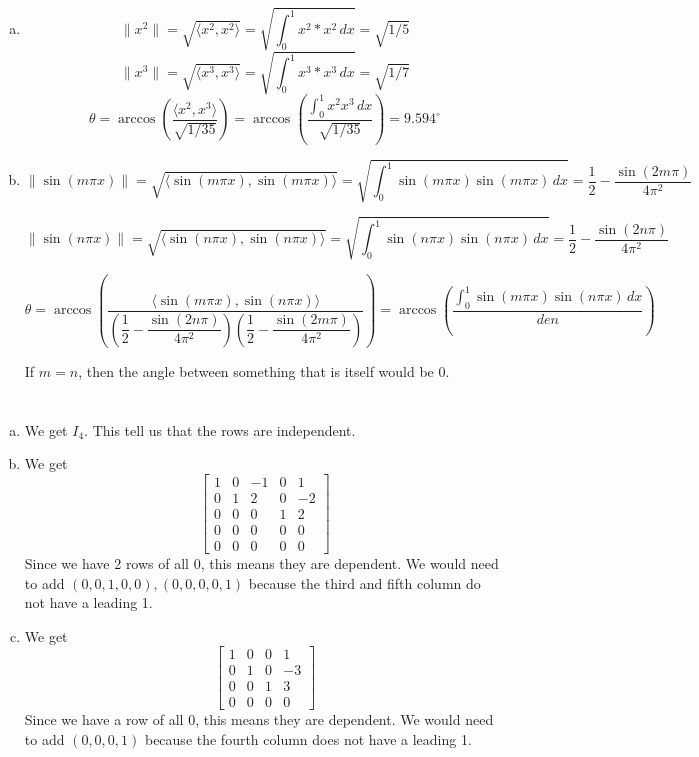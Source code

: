 \documentclass[12pt]{article}
\begin{document}
\section{}
\begin{enumerate}[(a)]
	\item \[ \|x^2\| = \sqrt{\langle x^2, x^2 \rangle} = \sqrt{\int_{0}^{1} x^2 * x^2 \,dx} = \sqrt{1/5}\]
	\[ \|x^3\| = \sqrt{\langle x^3, x^3 \rangle} = \sqrt{\int_{0}^{1} x^3 * x^3 \,dx} = \sqrt{1/7}\]
	\[\theta = \arccos\left(\dfrac{\langle x^2, x^3 \rangle}{\sqrt{1/35}}\right) = \arccos\left(\dfrac{\int_{0}^{1} x^2 x^3 \,dx}{\sqrt{1/35}}\right) = 9.594^{\circ}\]
	
	\item \[ \|\sin(m\pi x)\| = \sqrt{\langle \sin(m\pi x), \sin(m\pi x) \rangle} = \sqrt{\int_{0}^{1} \sin(m\pi x)\sin(m\pi x)\, dx} = \dfrac{1}{2} - \dfrac{\sin(2m\pi )}{4\pi^2}\]
	
	\[ \|\sin(n\pi x)\| = \sqrt{\langle \sin(n\pi x), \sin(n\pi x) \rangle} = \sqrt{\int_{0}^{1} \sin(n\pi x)\sin(n\pi x)\, dx} = \dfrac{1}{2} - \dfrac{\sin(2n\pi )}{4\pi^2}\]
	
	\[\theta = \arccos\left(\dfrac{\langle \sin(m\pi x), \sin(n\pi x)\rangle}{\left(\dfrac{1}{2} - \dfrac{\sin(2n\pi )}{4\pi^2}\right)\left(\dfrac{1}{2} - \dfrac{\sin(2m\pi )}{4\pi^2}\right)}\right) = \arccos\left(\dfrac{\int_0^1 \sin(m\pi x)\sin(n\pi x)\,dx}{den}\right)\]
	
	If $ m=n $, then the angle between something that is itself would be 0. 
\end{enumerate}
\newpage

\section{}
\begin{enumerate}[(a)]
	\item We get $ I_4 $. This tell us that the rows are independent.
	
	\item We get \[\begin{bmatrix}
		1 & 0 &-1 & 0 & 1\\
		0 & 1 & 2 & 0 & -2\\
		0 & 0 & 0 & 1 & 2\\
		0 & 0 & 0 & 0 & 0\\
		0 & 0 & 0 & 0 & 0
	\end{bmatrix}\] Since we have 2 rows of all 0, this means they are dependent. We would need to add $ (0,0,1,0,0), (0,0,0,0,1) $ because the third and fifth column do not have a leading 1.

	\item We get \[\begin{bmatrix}
		1 & 0 & 0 & 1\\
		0 & 1 & 0 & -3\\
		0 & 0 & 1 & 3\\
		0 & 0 & 0 & 0
	\end{bmatrix}\] Since we have a row of all 0, this means they are dependent. We would need to add $ (0,0,0,1) $ because the fourth column does not have a leading 1.
\end{enumerate}
\newpage
\end{document}
